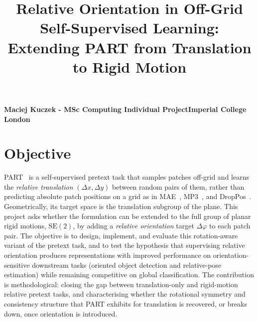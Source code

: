 \documentclass[11pt,a4paper]{article}
\title{\vspace{-2.5em}\textbf{Relative Orientation in Off-Grid Self-Supervised Learning:\\
Extending PART from Translation to Rigid Motion}}
\author{}
\date{}
\begin{document}
\maketitle
\vspace{-3.5em}

\noindent\textbf{Maciej Kuczek - MSc Computing Individual Project}\hfill\textbf{Imperial College London}

\vspace{0.8em}

\section{Objective}
PART~\cite{part} is a self-supervised pretext task that samples patches off-grid and learns the \emph{relative translation} $(\Delta x, \Delta y)$ between random pairs of them, rather than predicting absolute patch positions on a grid as in MAE~\cite{mae}, MP3~\cite{mp3}, and DropPos~\cite{droppos}. Geometrically, its target space is the translation subgroup of the plane. This project asks whether the formulation can be extended to the full group of planar rigid motions, $\mathrm{SE}(2)$, by adding a \emph{relative orientation} target $\Delta\varphi$ to each patch pair. The objective is to design, implement, and evaluate this rotation-aware variant of the pretext task, and to test the hypothesis that supervising relative orientation produces representations with improved performance on orientation-sensitive downstream tasks (oriented object detection and relative-pose estimation) while remaining competitive on global classification. The contribution is methodological: closing the gap between translation-only and rigid-motion relative pretext tasks, and characterising whether the rotational symmetry and consistency structure that PART exhibits for translation is recovered, or breaks down, once orientation is introduced.
\end{document}
